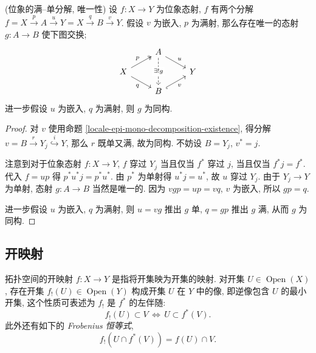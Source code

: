\begin{prop}
	{(位象的满--单分解, 唯一性)}
	设 $f\colon X\to Y$ 为位象态射, $f$ 有两个分解 $f=X\overset{p}{\to} A\overset{u}{\to} Y = X\overset{q}{\to} B\overset{v}{\to} Y$.
	假设 $v$ 为嵌入, $p$ 为满射, 那么存在唯一的态射 $g\colon A\to B$ 使下图交换;
	\[\begin{tikzcd}[ampersand replacement=\&,row sep=small]
		\& A \\
		X \&\& Y \\
		\& B
		\arrow["p", two heads, from=2-1, to=1-2]
		\arrow["u", from=1-2, to=2-3]
		\arrow["q"', from=2-1, to=3-2]
		\arrow["v"', hook', from=3-2, to=2-3]
		\arrow["{\exists ! g}"{description}, dashed, from=1-2, to=3-2]
	\end{tikzcd}\]
	进一步假设 $u$ 为嵌入, $q$ 为满射, 则 $g$ 为同构.
\end{prop}
\begin{proof}
	对 $v$ 使用命题 \ref{locale-epi-mono-decomposition-existence},
	得分解 $v=B\overset{r}{\to} Y_j\overset{i}{\hookrightarrow} Y$, 那么 $r$ 既单又满, 故为同构.
	不妨设 $B = Y_j$, $v^* = j$.
	
	注意到对于位象态射 $f\colon X\to Y$, $f$ 穿过 $Y_j$ 当且仅当 $f^*$ 穿过 $j$, 当且仅当 $f^* j = f^*$.
	代入 $f=up$ 得 $p^*u^* j = p^*u^*$.
	由 $p^*$ 为单射得 $u^*j = u^*$, 故 $u$ 穿过 $Y_j$. 由于 $Y_j\to Y$ 为单射, 态射 $g\colon A\to B$ 当然是唯一的.
	因为 $vgp = up = vq$, $v$ 为嵌入, 所以 $gp=q$.
	
	进一步假设 $u$ 为嵌入, $q$ 为满射, 则 $u=vg$ 推出 $g$ 单, $q=gp$ 推出 $g$ 满, 从而 $g$ 为同构.
\end{proof}

\subsection{开映射}


拓扑空间的开映射 $f\colon X\to Y$ 是指将开集映为开集的映射. 对开集 $U\in\operatorname{Open}(X)$, 存在开集
$f_!(U) \in \operatorname{Open}(Y)$ 构成开集 $U$ 在 $Y$ 中的像, 即逆像包含 $U$ 的最小开集, 这个性质可表述为 $f_!$ 是 $f^*$ 的左伴随:
\[
f_!(U) \subset V \,\Leftrightarrow\, U\subset f^*(V).
\]
此外还有如下的 \emph{Frobenius 恒等式},
\[
f_!(U\cap f^*(V)) = f(U)\cap V.
\]

